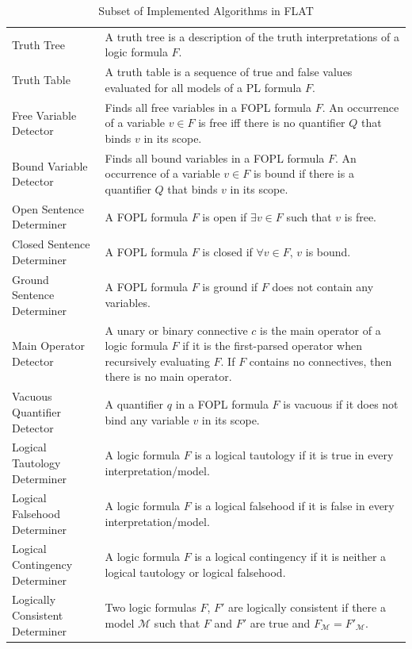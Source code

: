 \documentclass[ms]{uncgdissertationexp2}
\theoremstyle{plain}
\theoremstyle{definition}
\theoremstyle{remark}
\begin{document}
\begin{table}
	\caption{Subset of Implemented Algorithms in FLAT}
	\label{table:flat}
	\small
	\begin{tabular}{p{3cm}p{11cm}}
	  \toprule
	  \thead{Algorithm}&\thead{Definition}\\
	  \midrule
	  Truth Tree&A truth tree is a description of the truth interpretations of a logic formula $F$.\\
	  Truth Table&A truth table is a sequence of true and false values evaluated for all models of a PL formula $F$.\\
	  Free Variable Detector&Finds all free variables in a FOPL formula $F$. An occurrence of a variable $v \in F$ is free iff there is no quantifier $Q$ that binds $v$ in its scope.\\
	  Bound Variable Detector&Finds all bound variables in a FOPL formula $F$. An occurrence of a variable $v \in F$ is bound if there is a quantifier $Q$ that binds $v$ in its scope.\\
	  Open Sentence Determiner&A FOPL formula $F$ is open if $\exists{v} \in F$ such that $v$ is free.\\
	  Closed Sentence Determiner&A FOPL formula $F$ is closed if $\forall{v} \in F$, $v$ is bound.\\
	  Ground Sentence Determiner&A FOPL formula $F$ is ground if $F$ does not contain any variables.\\
	  Main Operator Detector&A unary or binary connective $c$ is the main operator of a logic formula $F$ if it is the first-parsed operator when recursively evaluating $F$. If $F$ contains no connectives, then there is no main operator.\\
	  Vacuous Quantifier Detector&A quantifier $q$ in a FOPL formula $F$ is vacuous if it does not bind any variable $v$ in its scope.\\
	  Logical Tautology Determiner&A logic formula $F$ is a logical tautology if it is true in every interpretation/model.\\
	  Logical Falsehood Determiner&A logic formula $F$ is a logical falsehood if it is false in every interpretation/model.\\
	  Logical Contingency Determiner&A logic formula $F$ is a logical contingency if it is neither a logical tautology or logical falsehood.\\
	  Logically Consistent Determiner&Two logic formulas $F$, $F'$ are logically consistent if there a model $\mathcal{M}$ such that $F$ and $F'$ are true and $F_{\mathcal{M}} = F'_{\mathcal{M}}.$\\

\end{tabular}
\end{table}
\end{document}

